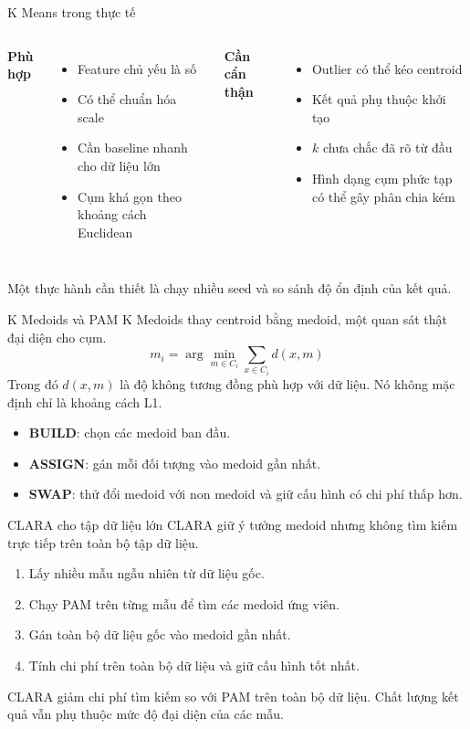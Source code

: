 \documentclass[aspectratio=169,11pt]{beamer}
\begin{document}
\begin{frame}{K Means trong thực tế}
\begin{columns}[T]
\textbf{Phù hợp}
\begin{itemize}
  \item Feature chủ yếu là số
  \item Có thể chuẩn hóa scale
  \item Cần baseline nhanh cho dữ liệu lớn
  \item Cụm khá gọn theo khoảng cách Euclidean
\end{itemize}
\textbf{Cần cẩn thận}
\begin{itemize}
  \item Outlier có thể kéo centroid
  \item Kết quả phụ thuộc khởi tạo
  \item $k$ chưa chắc đã rõ từ đầu
  \item Hình dạng cụm phức tạp có thể gây phân chia kém
\end{itemize}
\end{columns}
\vspace{0.6em}
Một thực hành cần thiết là chạy nhiều seed và so sánh độ ổn định của kết quả.
\end{frame}

\begin{frame}{K Medoids và PAM}
K Medoids thay centroid bằng \alert{medoid}, một quan sát thật đại diện cho cụm.
\[
m_i = \arg\min_{m\in C_i}\sum_{x\in C_i} d(x,m)
\]
Trong đó $d(x,m)$ là độ không tương đồng phù hợp với dữ liệu. Nó không mặc định chỉ là khoảng cách L1.
\begin{itemize}
  \item \textbf{BUILD}: chọn các medoid ban đầu.
  \item \textbf{ASSIGN}: gán mỗi đối tượng vào medoid gần nhất.
  \item \textbf{SWAP}: thử đổi medoid với non medoid và giữ cấu hình có chi phí thấp hơn.
\end{itemize}
\end{frame}

\begin{frame}{CLARA cho tập dữ liệu lớn}
CLARA giữ ý tưởng medoid nhưng không tìm kiếm trực tiếp trên toàn bộ tập dữ liệu.
\begin{enumerate}
  \item Lấy nhiều mẫu ngẫu nhiên từ dữ liệu gốc.
  \item Chạy PAM trên từng mẫu để tìm các medoid ứng viên.
  \item Gán toàn bộ dữ liệu gốc vào medoid gần nhất.
  \item Tính chi phí trên toàn bộ dữ liệu và giữ cấu hình tốt nhất.
\end{enumerate}
\vspace{0.5em}
CLARA giảm chi phí tìm kiếm so với PAM trên toàn bộ dữ liệu. Chất lượng kết quả vẫn phụ thuộc mức độ đại diện của các mẫu.
\end{frame}
\end{document}

